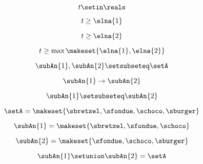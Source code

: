 \begin{forslides}
    \begin{equation}
        \label{eq:feedback-064}
        t \setin \reals
    \end{equation}

    \begin{equation}
        \label{eq:feedback-065}
        t \geq \elna{1}
    \end{equation}

    \begin{equation}
        \label{eq:feedback-066}
        t \geq \elna{2}
    \end{equation}

    \begin{equation}
        \label{eq:feedback-067}
        t \geq \max \makeset{ \elna{1}, \elna{2} }
    \end{equation}

    \begin{equation}
        \label{eq:feedback-068}
        \subAn{1}, \subAn{2} \setsubseteq \setA
    \end{equation}

    \begin{equation}
        \label{eq:feedback-069}
        \subAn{1} \to \subAn{2}
    \end{equation}

    \begin{equation}
        \label{eq:feedback-070}
        \subAn{1} \setsubseteq \subAn{2}
    \end{equation}

    \begin{equation}
        \label{eq:feedback-071}
        \setA = \makeset{ \sbretzel, \sfondue, \schoco, \sburger }
    \end{equation}

    \begin{equation}
        \label{eq:feedback-071b}
        \subAn{1} = \makeset{ \sbretzel, \sfondue, \schoco }
    \end{equation}

    \begin{equation}
        \label{eq:feedback-072}
        \subAn{2} = \makeset{\sfondue, \schoco, \sburger }
    \end{equation}

    \begin{equation}
        \label{eq:feedback-073}
        \subAn{1} \setunion \subAn{2} = \setA
    \end{equation}


\end{forslides}
